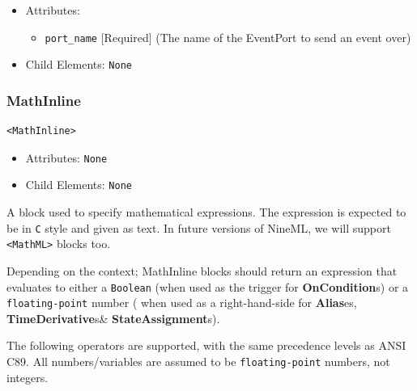 \documentclass{article}
\newcommand{\StateAssignments}{{\bf{StateAssignment}}s\xspace}
\newcommand{\TimeDerivatives}{{\bf{TimeDerivative}}s\xspace}
\newcommand{\Aliases}{{\bf{Alias}}es\xspace}
\newcommand{\OnConditions}{{\bf{OnCondition}}s\xspace}
\begin{document}
\begin{itemize}
\item Attributes:
%
\begin{itemize}
\item \verb|port_name| {[}Required{]} (The name of the EventPort to send an
event over)
\end{itemize}

\item Child Elements: \texttt{None}
\end{itemize}

\subsubsection{MathInline}
%
\begin{lstlisting}
<MathInline>
\end{lstlisting}
\begin{itemize}
\item Attributes:  \texttt{None}

\item Child Elements: \texttt{None}
\end{itemize}

A block used to specify mathematical expressions. The expression is expected to
be in \texttt{C} style and given as text. In future versions of NineML, we will
support \verb|<MathML>| blocks too.

Depending on the context; MathInline blocks should return an expression that
evaluates to either a \verb|Boolean| (when used as the trigger for
\OnConditions) or a \verb|floating-point| number ( when used  as a
right-hand-side for  \Aliases, \TimeDerivatives \& \StateAssignments).

The following operators are supported, with the same precedence levels as ANSI
C89. All
numbers/variables are assumed to be \verb|floating-point| numbers, not integers.
\end{document}
